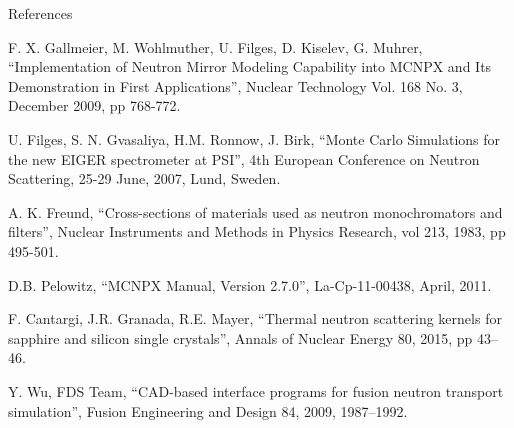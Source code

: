 \documentclass[final,t]{beamer}
\begin{document}
\begin{frame}{}
\begin{block}{References}
      
        \begin{thebibliography}{9}   %
\scriptsize
{}
  F. X. Gallmeier, M. Wohlmuther, U. Filges, D. Kiselev, G. Muhrer,
  ``Implementation of Neutron Mirror Modeling Capability into MCNPX and Its Demonstration in First Applications'',
  Nuclear Technology Vol. 168 No. 3, December 2009, pp 768-772. 

  U. Filges, S. N. Gvasaliya, H.M. Ronnow, J. Birk,
  ``Monte Carlo Simulations for the new EIGER spectrometer at PSI'',
  4th European Conference on Neutron Scattering, 25-29 June, 2007, Lund, Sweden. 

A. K. Freund,
``Cross-sections of materials used as neutron monochromators and filters'',
Nuclear Instruments and Methods in Physics Research, vol 213, 1983, pp 495-501.

   D.B. Pelowitz,
   ``MCNPX Manual, Version 2.7.0'',
   La-Cp-11-00438, April, 2011.

  F. Cantargi, J.R. Granada, R.E. Mayer, 
  ``Thermal neutron scattering kernels for sapphire and silicon single crystals'', 
  Annals of Nuclear Energy 80, 2015, pp 43–46.  

  Y. Wu, FDS Team, 
  ``CAD-based interface programs for fusion neutron transport simulation'', 
  Fusion Engineering and Design 84, 2009, 1987–1992. \\

\end{thebibliography}
      \end{block}

\end{frame}
\end{document}
